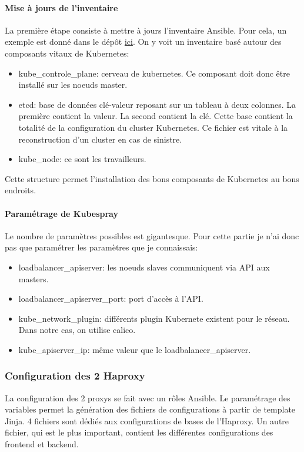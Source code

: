 \documentclass[12pt]{article}
\begin{document}
\paragraph{Mise à jours de l'inventaire}
La première étape consiste à mettre à jours l'inventaire Ansible.
Pour cela, un exemple est donné dans le dépôt \href{https://github.com/kubernetes-sigs/kubespray/blob/master/inventory/sample/inventory.ini}{ici}.
On y voit un inventaire basé autour des composants vitaux de Kubernetes:
\begin{itemize}
    \item kube\_controle\_plane: cerveau de kubernetes.
    Ce composant doit donc être installé sur les noeuds master.
    \item etcd: base de données clé-valeur reposant sur un tableau à deux colonnes.
    La première contient la valeur.
    La second contient la clé.
    Cette base contient la totalité de la configuration du cluster Kubernetes.
    Ce fichier est vitale à la reconstruction d'un cluster en cas de sinistre.
    \item kube\_node: ce sont les travailleurs.
\end{itemize}

Cette structure permet l'installation des bons composants de Kubernetes au bons endroits.

\paragraph{Paramétrage de Kubespray}
Le nombre de paramètres possibles est gigantesque.
Pour cette partie je n'ai donc pas que paramétrer les paramètres que je connaissais:
\begin{itemize}
    \item loadbalancer\_apiserver: les noeuds slaves communiquent via API aux masters.
    \item loadbalancer\_apiserver\_port: port d'accès à l'API.
    \item kube\_network\_plugin: différents plugin Kubernete existent pour le réseau.
    Dans notre cas, on utilise calico.
    \item kube\_apiserver\_ip: même valeur que le loadbalancer\_apiserver.
\end{itemize}

\subsubsection{Configuration des 2 Haproxy}
La configuration des 2 proxys se fait avec un rôles Ansible.
Le paramétrage des variables permet la génération des fichiers de configurations à partir de template Jinja.
4 fichiers sont dédiés aux configurations de bases de l'Haproxy.
Un autre fichier, qui est le plus important, contient les différentes configurations des frontend et backend.
\end{document}
